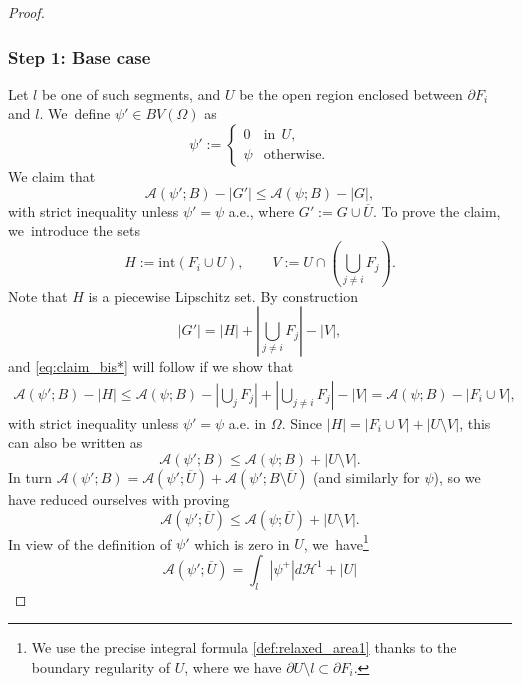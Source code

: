 \documentclass[JEP,XML,SOM,Unicode, NoFloatCountersInSection,published]{cedram}
\let\Om\Omega
\theoremstyle{definition}
\begin{document}
\begin{proof}
\subsubsection*{Step 1: Base case} Let $l$ be one of such segments, and
$U$ be the open region enclosed between $\partial F_i$ and $l$. We~define $\psi'\in BV(\Om)$ as
\begin{equation*}
\psi':=\begin{cases}
0&\text{in}\ \ U,\\
\psi &\text{otherwise}.
\end{cases}
\end{equation*}
We claim that
\begin{equation}\label{eq:claim_bis*}
\mathcal{A}(\psi';B)-|G'|\le\mathcal{A}(\psi;B)-|G|,
\end{equation}
with strict inequality unless $\psi'=\psi$ a.e., where $G':= G \cup
\overline U$.
To prove the claim, we~introduce the sets
\[
H:=\mathrm{int}(F_i\cup U),\qquad
V:=U\cap(\bigcup_{j\neq i}F_j).
\]
Note that $H$ is a piecewise Lipschitz set.
By construction
\begin{equation*}
|G'|=|{H}|+ |\bigcup_{j\neq i}F_j|-|V|,
\end{equation*}
and \eqref{eq:claim_bis*} will follow if we show that
\begin{equation*}
\begin{split}
\mathcal{A}(\psi';B)-|{H}| \le \mathcal{A}(\psi;B)-|\bigcup_j F_j|+|\bigcup_{j\neq i}F_j|-|V|=\mathcal{A}(\psi;B)-|F_i\cup V|,
\end{split}
\end{equation*}
with strict inequality unless $\psi'=\psi$ a.e. in $\Om$.
Since $|H|=|F_i\cup V|+|U\setminus V|$, this can also be written as
\begin{equation*}
\mathcal{A}(\psi';B)
\le\mathcal{A}(\psi;B)+|U\setminus V|.
\end{equation*}
In turn $\mathcal{A}(\psi';B)=\mathcal{A}(\psi';\overline U)+\mathcal{A}(\psi';B\setminus \overline U)$ (and similarly for $\psi$), so we have reduced ourselves with proving
\begin{equation}\label{eq:claim_tris**}
\mathcal{A}(\psi';\overline U)
\le\mathcal{A}(\psi;\overline U)+|U\setminus V|.
\end{equation}
In view of the definition of $\psi'$ which is zero
in $U$, we~have\footnote{We use the precise integral formula \eqref{def:relaxed_area1} thanks to the boundary regularity of $U$, where we have $\partial U\setminus l\subset \partial F_i$.}
\[
\mathcal{A}(\psi';\overline U)=\int_l|{\psi}^+|d\mathcal H^1+|U|
\]
\end{proof}
\end{document}
